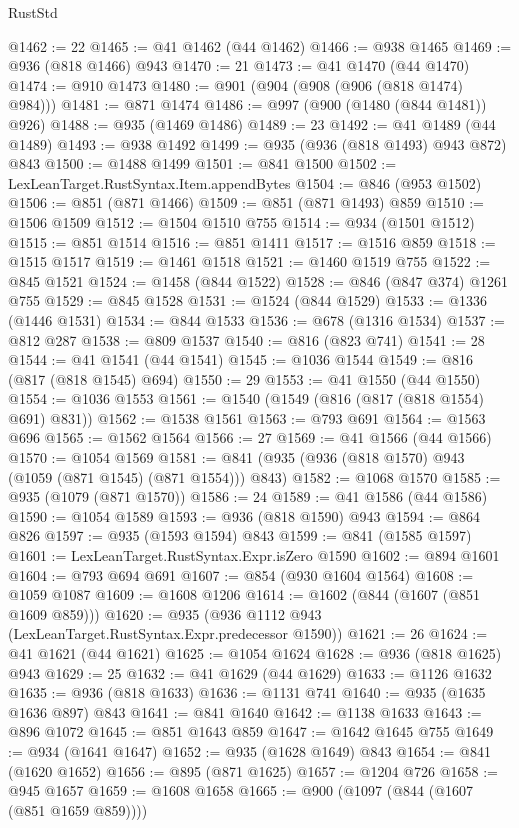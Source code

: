 \begin{lexlean}{RustStd}
\begin{coremodule}
@1462 := 22
@1465 := @41 @1462 (@44 @1462)
@1466 := @938 @1465
@1469 := @936 (@818 @1466) @943
@1470 := 21
@1473 := @41 @1470 (@44 @1470)
@1474 := @910 @1473
@1480 := @901 (@904 (@908 (@906 (@818 @1474) @984)))
@1481 := @871 @1474
@1486 := @997 (@900 (@1480 (@844 @1481)) @926)
@1488 := @935 (@1469 @1486)
@1489 := 23
@1492 := @41 @1489 (@44 @1489)
@1493 := @938 @1492
@1499 := @935 (@936 (@818 @1493) @943 @872) @843
@1500 := @1488 @1499
@1501 := @841 @1500
@1502 := LexLeanTarget.RustSyntax.Item.appendBytes
@1504 := @846 (@953 @1502)
@1506 := @851 (@871 @1466)
@1509 := @851 (@871 @1493) @859
@1510 := @1506 @1509
@1512 := @1504 @1510 @755
@1514 := @934 (@1501 @1512)
@1515 := @851 @1514
@1516 := @851 @1411
@1517 := @1516 @859
@1518 := @1515 @1517
@1519 := @1461 @1518
@1521 := @1460 @1519 @755
@1522 := @845 @1521
@1524 := @1458 (@844 @1522)
@1528 := @846 (@847 @374) @1261 @755
@1529 := @845 @1528
@1531 := @1524 (@844 @1529)
@1533 := @1336 (@1446 @1531)
@1534 := @844 @1533
@1536 := @678 (@1316 @1534)
@1537 := @812 @287
@1538 := @809 @1537
@1540 := @816 (@823 @741)
@1541 := 28
@1544 := @41 @1541 (@44 @1541)
@1545 := @1036 @1544
@1549 := @816 (@817 (@818 @1545) @694)
@1550 := 29
@1553 := @41 @1550 (@44 @1550)
@1554 := @1036 @1553
@1561 := @1540 (@1549 (@816 (@817 (@818 @1554) @691) @831))
@1562 := @1538 @1561
@1563 := @793 @691
@1564 := @1563 @696
@1565 := @1562 @1564
@1566 := 27
@1569 := @41 @1566 (@44 @1566)
@1570 := @1054 @1569
@1581 := @841 (@935 (@936 (@818 @1570) @943 (@1059 (@871 @1545) (@871 @1554))) @843)
@1582 := @1068 @1570
@1585 := @935 (@1079 (@871 @1570))
@1586 := 24
@1589 := @41 @1586 (@44 @1586)
@1590 := @1054 @1589
@1593 := @936 (@818 @1590) @943
@1594 := @864 @826
@1597 := @935 (@1593 @1594) @843
@1599 := @841 (@1585 @1597)
@1601 := LexLeanTarget.RustSyntax.Expr.isZero @1590
@1602 := @894 @1601
@1604 := @793 @694 @691
@1607 := @854 (@930 @1604 @1564)
@1608 := @1059 @1087
@1609 := @1608 @1206
@1614 := @1602 (@844 (@1607 (@851 @1609 @859)))
@1620 := @935 (@936 @1112 @943 (LexLeanTarget.RustSyntax.Expr.predecessor @1590))
@1621 := 26
@1624 := @41 @1621 (@44 @1621)
@1625 := @1054 @1624
@1628 := @936 (@818 @1625) @943
@1629 := 25
@1632 := @41 @1629 (@44 @1629)
@1633 := @1126 @1632
@1635 := @936 (@818 @1633)
@1636 := @1131 @741
@1640 := @935 (@1635 @1636 @897) @843
@1641 := @841 @1640
@1642 := @1138 @1633
@1643 := @896 @1072
@1645 := @851 @1643 @859
@1647 := @1642 @1645 @755
@1649 := @934 (@1641 @1647)
@1652 := @935 (@1628 @1649) @843
@1654 := @841 (@1620 @1652)
@1656 := @895 (@871 @1625)
@1657 := @1204 @726
@1658 := @945 @1657
@1659 := @1608 @1658
@1665 := @900 (@1097 (@844 (@1607 (@851 @1659 @859))))

\end{coremodule}
\end{lexlean}
